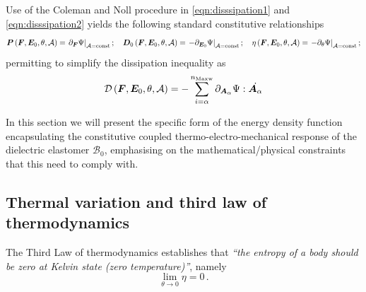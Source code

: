 Use of the Coleman and Noll procedure in \eqref{eqn:disssipation1} and \eqref{eqn:disssipation2} yields the following standard constitutive relationships 
%
\begin{equation}\label{eqn:constitutive 1}
	\begin{aligned}
		\boldsymbol{P}\left(\boldsymbol{F},\boldsymbol{E}_0,\theta,\mathcal{A}\right)=\left.\partial_{\boldsymbol{F}}\Psi\right\vert_{\mathcal{A}=\text{const}}; \quad 
		\boldsymbol{D}_0\left(\boldsymbol{F},\boldsymbol{E}_0,\theta,\mathcal{A}\right)=\left.-\partial_{\boldsymbol{E}_0}\Psi\right\vert_{\mathcal{A}=\text{const}};	\quad
		\eta\left(\boldsymbol{F},\boldsymbol{E}_0,\theta,\mathcal{A}\right)=\left.-\partial_{\theta}\Psi\right\vert_{\mathcal{A}=\text{const}};	
	\end{aligned}
\end{equation}
%
permitting to simplify the dissipation inequality as
%
\begin{equation}
	\mathcal{D}\left(\boldsymbol{F},\boldsymbol{E}_0,\theta,\mathcal{A}\right)=-	\sum_{i={\alpha}}^{n_\text{Maxw}}\partial_{\boldsymbol{A}_{\alpha}}\Psi: \dot{\boldsymbol{A}_{\alpha}}
\end{equation}


In this section we will present the specific form of the energy density function encapsulating the constitutive coupled thermo-electro-mechanical response of the dielectric elastomer $\mathcal{B}_0$, emphasising on the mathematical/physical constraints that this need to comply with.




\subsection{Thermal variation and third law of thermodynamics}
\label{sec:third_law_thermodynamics}

The Third Law of thermodynamics establishes that \textit{“the entropy of a body should be zero at Kelvin state (zero temperature)”}, namely 
%
\begin{equation}
  \lim_{\theta \rightarrow 0} \eta = 0 \,.
\end{equation}



